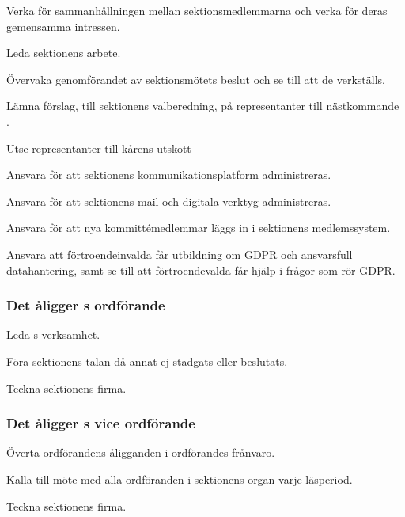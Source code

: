 \begin{att}
	\item Verka för sammanhållningen mellan sektionsmedlemmarna och verka för deras gemensamma intressen.
	\item Leda sektionens arbete.
	\item Övervaka genomförandet av sektionsmötets beslut och se till att de verkställs.
	\item Lämna förslag, till sektionens valberedning, på representanter till nästkommande \STYRIT.
	\item Utse representanter till kårens utskott
	\item Ansvara för att sektionens kommunikationsplatform administreras.
	\item Ansvara för att sektionens mail och digitala verktyg administreras.
	\item Ansvara för att nya kommittémedlemmar läggs in i sektionens medlemssystem.
	\item Ansvara att förtroendeinvalda får utbildning om GDPR och ansvarsfull datahantering, samt se till att förtroendevalda får hjälp i frågor som rör GDPR.
\end{att}

\subsubsection{Det åligger \STYRIT{}s ordförande}
\begin{att}
	\item Leda \STYRIT{}s verksamhet.
	\item Föra sektionens talan då annat ej stadgats eller beslutats.
	\item Teckna sektionens firma.
\end{att}

\subsubsection{Det åligger \STYRIT{}s vice ordförande}
\begin{att}
	\item Överta ordförandens åligganden i ordförandes frånvaro.
	\item Kalla till möte med alla ordföranden i sektionens organ varje läsperiod.
    \item Teckna sektionens firma.
\end{att}

